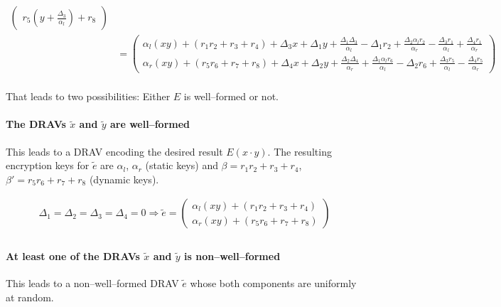 \begin{align*}
\begin{pmatrix}
    r_5          \left(y + \frac{\Delta_3}{\alpha_l}\right) + r_8
  \end{pmatrix} \\
%
  & =
  \begin{pmatrix}
    \alpha_l(xy) + (r_1r_2 + r_3 + r_4)
    + \Delta_3x + \Delta_1y
    + \frac{\Delta_1\Delta_3}{\alpha_l}
    - \Delta_1r_2
    + \frac{\Delta_2\alpha_lr_2}{\alpha_r}
    - \frac{\Delta_3r_1}{\alpha_l}
    + \frac{\Delta_4r_1}{\alpha_r}
    \\
    \alpha_r(xy) + (r_5r_6 + r_7 + r_8)
    + \Delta_4x + \Delta_2y
    + \frac{\Delta_2\Delta_4}{\alpha_r}
    + \frac{\Delta_1\alpha_lr_6}{\alpha_l}
    - \Delta_2r_6
    + \frac{\Delta_3r_5}{\alpha_l}
    - \frac{\Delta_4r_5}{\alpha_r}
  \end{pmatrix} \\
%
\end{align*}

\noindent{}That leads to two possibilities: Either $E$ is well--formed or not.

\paragraph{The DRAVs $\widetilde{x}$ and $\widetilde{y}$ are well--formed}

This leads to a DRAV encoding the desired result $E(x \cdot y)$. The resulting
encryption keys for $\widetilde{e}$ are $\alpha_l$, $\alpha_r$ (static keys) and
$\beta = r_1r_2 + r_3 + r_4$, $\beta' = r_5r_6 + r_7 + r_8$ (dynamic keys).

\begin{align*}
  \Delta_1=\Delta_2=\Delta_3=\Delta_4=0 \Rightarrow
  \widetilde{e} =
  \begin{pmatrix}
    \alpha_l(xy) + (r_1r_2 + r_3 + r_4) \\
    \alpha_r(xy) + (r_5r_6 + r_7 + r_8)
  \end{pmatrix} \\
\end{align*}

\paragraph{At least one of the DRAVs $\widetilde{x}$ and $\widetilde{y}$ is
non--well--formed} This leads to a non--well--formed DRAV $\widetilde{e}$ whose
both components are uniformly at random.

